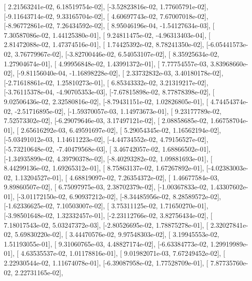 \documentclass{article}
\begin{document}
       [ 2.21563241e-02,  6.18519754e-02],
       [-3.52823816e-02,  1.77605791e-02],
       [-9.11643714e-02,  9.33165704e-02],
       [ 4.60697743e-02,  7.67007018e-02],
       [-8.96772861e-02,  7.26434592e-02],
       [ 8.95046196e-04, -1.54127634e-03],
       [ 7.30587086e-02,  1.44125380e-01],
       [ 9.24811475e-02, -4.96313403e-04],
       [ 2.81472088e-02,  1.47374516e-01],
       [ 1.74425392e-02,  8.78241350e-02],
       [-6.05441573e-02,  3.76779967e-02],
       [-3.82700446e-02,  6.54053107e-02],
       [ 8.35925634e-02,  1.27904674e-01],
       [ 4.99956848e-02,  1.43991372e-01],
       [ 7.77754557e-03,  3.83968660e-02],
       [-9.81156040e-04, -1.16898228e-02],
       [ 2.33732832e-03,  3.40180178e-02],
       [-2.71618861e-02,  1.25810273e-01],
       [ 6.85343332e-02,  3.21319217e-02],
       [-3.76115378e-04, -4.90705353e-03],
       [-7.67815898e-02,  8.77878398e-02],
       [ 9.02506436e-02,  2.32580816e-02],
       [-8.79431151e-02,  1.02826805e-01],
       [ 4.74454374e-02, -2.51716895e-02],
       [-1.59370057e-03,  1.14973673e-01],
       [ 9.23177789e-02,  7.52573302e-02],
       [-6.29079646e-03,  3.17497121e-02],
       [ 2.08858685e-02,  1.66758704e-01],
       [ 2.65616292e-03,  6.49591697e-02],
       [ 5.29054345e-02,  1.16562194e-02],
       [-5.03491012e-03,  1.14611223e-02],
       [-4.44734552e-02,  4.79156527e-02],
       [-5.73210648e-02, -7.40479568e-03],
       [ 3.46742057e-02,  1.68866502e-01],
       [-1.34935899e-02,  4.39790378e-02],
       [-8.40293282e-02,  1.09881693e-01],
       [ 8.44299136e-02,  1.69265312e-01],
       [ 8.75863137e-02,  1.67267892e-01],
       [-4.02383003e-02,  1.13204527e-01],
       [ 4.68819097e-02,  7.26354372e-02],
       [ 1.46677584e-03,  9.89860507e-02],
       [ 6.75097975e-03,  2.38702379e-02],
       [-1.00367833e-02,  1.43307602e-01],
       [-3.01172150e-02,  6.90937212e-02],
       [-8.34485956e-02,  8.28589572e-02],
       [-1.62336625e-02,  7.10503007e-02],
       [ 3.75311125e-02,  1.71650270e-01],
       [-3.98501648e-02,  1.32332457e-01],
       [-2.23112766e-02,  3.82756434e-02],
       [ 7.18017543e-02,  5.03247372e-03],
       [-2.80526695e-02,  1.78875278e-01],
       [ 2.32027841e-02,  5.69830220e-02],
       [ 3.44470576e-02,  9.97548303e-02],
       [ 3.19945553e-02,  1.51193055e-01],
       [ 9.31060765e-03,  4.48827174e-02],
       [-6.63384773e-02,  1.29919989e-01],
       [ 4.63535537e-02,  1.01178816e-01],
       [ 9.01982071e-03,  7.67249452e-02],
       [ 2.22930544e-02,  1.11674078e-01],
       [-6.39087958e-02,  1.77528709e-01],
       [ 7.87735760e-02,  2.22731165e-02],
\end{document}

